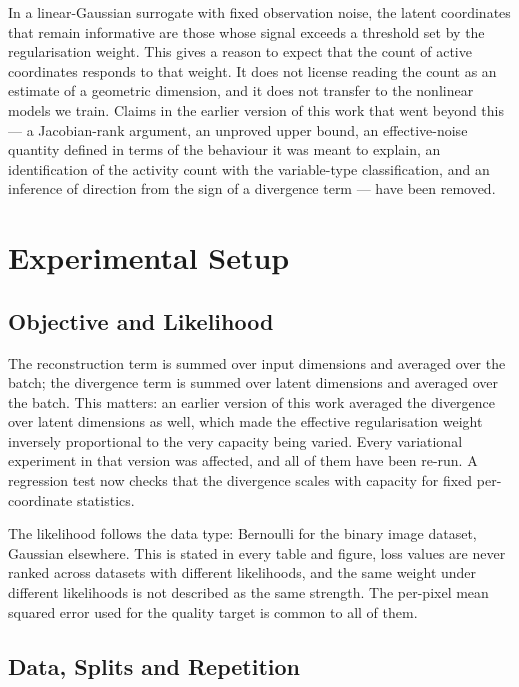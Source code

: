 \documentclass[make,article,submit,pdftex,moreauthors]{Definitions/mdpi}
\begin{document}
In a linear-Gaussian surrogate with fixed observation noise, the latent
coordinates that remain informative are those whose signal exceeds a
threshold set by the regularisation weight. This gives a reason to expect
that the count of active coordinates responds to that weight. It does not
license reading the count as an estimate of a geometric dimension, and it
does not transfer to the nonlinear models we train. Claims in the earlier
version of this work that went beyond this --- a Jacobian-rank argument, an
unproved upper bound, an effective-noise quantity defined in terms of the
behaviour it was meant to explain, an identification of the activity count
with the variable-type classification, and an inference of direction from
the sign of a divergence term --- have been removed.

\section{Experimental Setup}\label{sec:setup}

\subsection{Objective and Likelihood}\label{sec:setup_loss}

The reconstruction term is summed over input dimensions and averaged over
the batch; the divergence term is summed over latent dimensions and
averaged over the batch. This matters: an earlier version of this work
averaged the divergence over latent dimensions as well, which made the
effective regularisation weight inversely proportional to the very
capacity being varied. Every variational experiment in that version was
affected, and all of them have been re-run. A regression test now checks
that the divergence scales with capacity for fixed per-coordinate
statistics.

The likelihood follows the data type: Bernoulli for the binary image
dataset, Gaussian elsewhere. This is stated in every table and figure,
loss values are never ranked across datasets with different likelihoods,
and the same weight under different likelihoods is not described as the
same strength. The per-pixel mean squared error used for the quality
target is common to all of them.

\subsection{Data, Splits and Repetition}\label{sec:setup_data}
\end{document}
